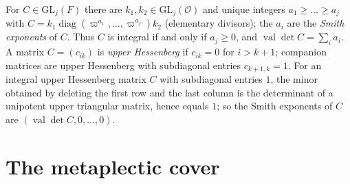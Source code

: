 \documentclass[11pt,oneside,notitlepage]{book}
\numberwithin{equation}{section}
\theoremstyle{plain}
\theoremstyle{definition}
\newcommand{\cO}{\mathcal{O}}
\newcommand{\GL}{\mathrm{GL}}
\newcommand{\val}{\operatorname{val}}
\newcommand{\diag}{\operatorname{diag}}
\begin{document}
For $C\in\GL_j(F)$ there are $k_1,k_2\in\GL_j(\cO)$ and unique integers $a_1\ge\dots\ge a_j$ with $C=k_1\diag(\varpi^{a_1},\dots,\varpi^{a_j})k_2$ (elementary divisors); the $a_i$ are the \emph{Smith exponents} of $C$. Thus $C$ is integral if and only if $a_j\ge0$, and $\val\det C=\sum_ia_i$. A matrix $C=(c_{ik})$ is \emph{upper Hessenberg} if $c_{ik}=0$ for $i>k+1$; companion matrices are upper Hessenberg with subdiagonal entries $c_{k+1,k}=1$. For an integral upper Hessenberg matrix $C$ with subdiagonal entries $1$, the minor obtained by deleting the first row and the last column is the determinant of a unipotent upper triangular matrix, hence equals $1$; so the Smith exponents of $C$ are $(\val\det C,0,\dots,0)$.

\section{The metaplectic cover}\label{sec:cover}
\end{document}
